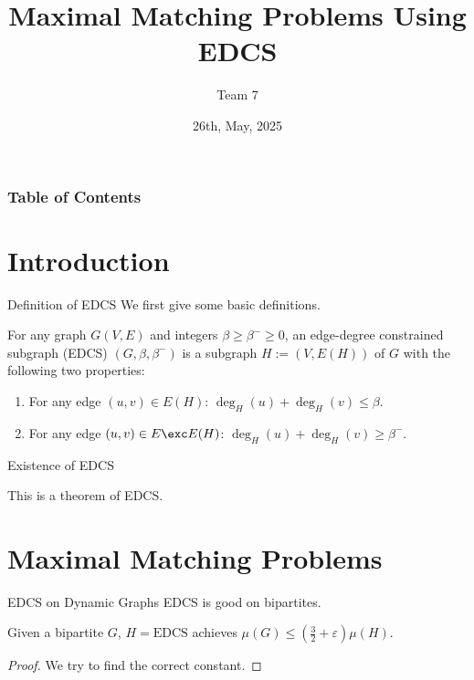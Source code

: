 \documentclass{beamer}
\title{Maximal Matching Problems Using EDCS}
\author{Team 7}
\date{26th, May, 2025}
\newcommand{\EDCS}{\text{EDCS}}
\begin{document}
\begin{frame}
  \titlepage
\end{frame}

\begin{frame}
  \frametitle{Table of Contents}
  \tableofcontents
\end{frame}

\section{Introduction}
\begin{frame}{Definition of EDCS}
    We first give some basic definitions.
    \begin{definition}[\cite{BS15}]
        For any graph $G(V,E)$ and integers $\beta\geq\beta^-\geq0$, 
        an edge-degree constrained subgraph (EDCS) $(G,\beta,\beta^-)$ is a subgraph 
        $H:=(V,E(H))$ of $G$ with the following two properties:
        \begin{enumerate}[label=(P\arabic*)]
            \item For any edge $(u,v)\in E(H)$: $\deg_H(u)+\deg_H(v)\leq\beta$.
            \item For any edge $(u,v)\in E\exc E(H)$: $\deg_H(u)+\deg_H(v)\geq\beta^-$.
        \end{enumerate}
    \end{definition}
\end{frame}

\begin{frame}{Existence of EDCS}
    \begin{theorem}
        This is a theorem of EDCS.
    \end{theorem}
\end{frame}

\section{Maximal Matching Problems}
\begin{frame}{EDCS on Dynamic Graphs}
    EDCS is good on bipartites.
    \begin{lemma}
        Given a bipartite $G$, $H=\EDCS$ achieves $\mu(G)\leq\left( \frac{3}{2}+\varepsilon \right)\mu(H)$.
    \end{lemma}   
    \begin{proof}
        We try to find the correct constant.
    \end{proof} 
\end{frame}
\end{document}
